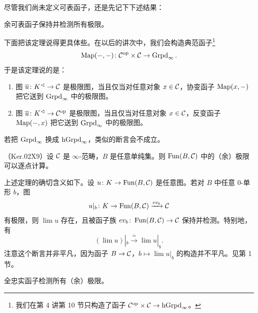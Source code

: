\nitem\label{L7-2.10} 尽管我们尚未定义可表函子，还是先记下下述结果：

\begin{theorem}\label{L7-2.11}
余可表函子保持并检测所有极限。
\end{theorem}

\begin{remark}\label{L7-2.12}
下面把该定理说得更具体些。在以后的讲次中，我们会构造典范函子\footnote{我们在第 4 讲第 10 节只构造了函子 $\mathcal{C}^{\mathrm{op}}\times\mathcal{C}\to\operatorname{hGrpd}_\infty$。}
\[
\operatorname{Map}(-,-)\colon\mathcal{C}^{\mathrm{op}}\times\mathcal{C}\to\operatorname{Grpd}_\infty.
\]
于是该定理说的是：
\begin{enumerate}[label=(\arabic*),leftmargin=2.4em,itemsep=0.1em]
\item 图 $\overline u\colon K^{\lhd}\to\mathcal{C}$ 是极限图，当且仅当对任意对象 $x\in\mathcal{C}$，协变函子 $\operatorname{Map}(x,-)$ 把它送到 $\operatorname{Grpd}_\infty$ 中的极限图。
\item 图 $\overline u\colon K^{\lhd}\to\mathcal{C}^{\mathrm{op}}$ 是极限图，当且仅当对任意对象 $x\in\mathcal{C}$，反变函子 $\operatorname{Map}(-,x)$ 把它送到 $\operatorname{Grpd}_\infty$ 中的极限图。
\end{enumerate}
\end{remark}

\begin{warning}\label{L7-2.13}
若把 $\operatorname{Grpd}_\infty$ 换成 $\operatorname{hGrpd}_\infty$，类似的断言会不成立。
\end{warning}

\begin{theorem}\label{L7-2.14}
（Ker.02X9）设 $\mathcal{C}$ 是 $\infty$-范畴，$B$ 是任意单纯集。则 $\operatorname{Fun}(B,\mathcal{C})$ 中的（余）极限可以逐点计算。
\end{theorem}

\begin{remark}\label{L7-2.15}
上述定理的确切含义如下。设 $u\colon K\to\operatorname{Fun}(B,\mathcal{C})$ 是任意图。若对 $B$ 中任意 $0$-单形 $b$，图
\[
u|_b\colon K\to\operatorname{Fun}(B,\mathcal{C})\xrightarrow{ev_b}\mathcal{C}
\]
有极限，则 $\lim u$ 存在，且被函子族 $ev_b\colon\operatorname{Fun}(B,\mathcal{C})\to\mathcal{C}$ 保持并检测。特别地，有
\[
(\lim u)|_b\xrightarrow{\ \simeq\ }\lim u|_b.
\]
注意这个断言并非平凡，因为函子 $B\to\mathcal{C}$，$b\mapsto\lim u|_b$ 的构造并不平凡。见第 1 节。
\end{remark}

\begin{proposition}\label{L7-2.16}
全忠实函子检测所有（余）极限。
\end{proposition}

